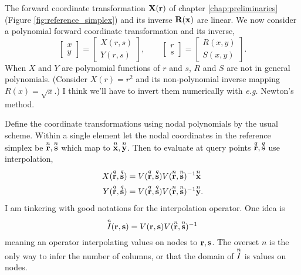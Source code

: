 The forward coordinate transformation $\textbf{X}(\textbf{r})$ of chapter \ref{chap:preliminaries} (Figure \ref{fig:reference_simplex}) and its inverse $\textbf{R}(\textbf{x})$ are linear.  We now consider a polynomial forward coordinate transformation and its inverse,
%
\begin{equation}
\begin{bmatrix}
x \\ y
\end{bmatrix}
=
\begin{bmatrix}
X(r, s) \\ Y(r,s)
\end{bmatrix},
\qquad
\begin{bmatrix}
r \\ s
\end{bmatrix}
=
\begin{bmatrix}
R(x, y) \\ S(x,y)
\end{bmatrix}.
\end{equation}
%
When $X$ and $Y$ are polynomial functions of $r$ and $s$, $R$ and $S$ are not in general polynomials.  (Consider $X(r) = r^2$ and its non-polynomial inverse mapping $R(x) = \sqrt{x}$.)  I think we'll have to invert them numerically with \emph{e.g.} Newton's method.

Define the coordinate transformations using nodal polynomials by the usual scheme.  Within a single element let the nodal coordinates in the reference simplex be $\overset{n}{\textbf{r}}, \overset{n}{\textbf{s}}$ which map to $\overset{n}{\textbf{x}}, \overset{n}{\textbf{y}}$.  Then to evaluate at query points $\overset{q}{\textbf{r}}, \overset{q}{\textbf{s}}$ use interpolation,
%
\begin{equation}
\begin{aligned}
X(\overset{q}{\textbf{r}}, \overset{q}{\textbf{s}}) &= V(\overset{q}{\textbf{r}}, \overset{q}{\textbf{s}}) V(\overset{n}{\textbf{r}}, \overset{n}{\textbf{s}})^{-1} \overset{n}{\textbf{x}} \\
Y(\overset{q}{\textbf{r}}, \overset{q}{\textbf{s}}) &= V(\overset{q}{\textbf{r}}, \overset{q}{\textbf{s}}) V(\overset{n}{\textbf{r}}, \overset{n}{\textbf{s}})^{-1} \overset{n}{\textbf{y}}.
\end{aligned}
\end{equation}
%
I am tinkering with good notations for the interpolation operator.  One idea is
%
\begin{equation}
\overset{n}{I}(\textbf{r}, \textbf{s}) = V(\textbf{r}, \textbf{s}) V(\overset{n}{\textbf{r}}, \overset{n}{\textbf{s}})^{-1}
\end{equation}
%
meaning an operator interpolating values on nodes to $\textbf{r}, \textbf{s}$.  The overset $n$ is the only way to infer the number of columns, or that the domain of $\overset{n}{I}$ is values on nodes.


